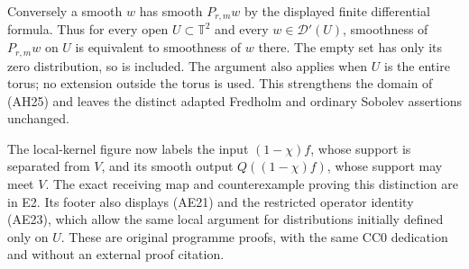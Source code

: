 \documentclass[
  11pt,
]{article}
\begin{document}
Conversely a smooth \(w\) has smooth \(P_{r,m}w\) by the displayed
finite differential formula. Thus for every open \(U\subset\mathbb T^2\)
and every \(w\in\mathcal D'(U)\), smoothness of \(P_{r,m}w\) on \(U\) is
equivalent to smoothness of \(w\) there. The empty set has only its zero
distribution, so is included. The argument also applies when \(U\) is
the entire torus; no extension outside the torus is used. This
strengthens the domain of (AH25) and leaves the distinct adapted
Fredholm and ordinary Sobolev assertions unchanged.

The local-kernel figure now labels the input \((1-\chi)f\), whose
support is separated from \(V\), and its smooth output \(Q((1-\chi)f)\),
whose support may meet \(V\). The exact receiving map and counterexample
proving this distinction are in E2. Its footer also displays (AE21) and
the restricted operator identity (AE23), which allow the same local
argument for distributions initially defined only on \(U\). These are
original programme proofs, with the same CC0 dedication and without an
external proof citation.
\end{document}
